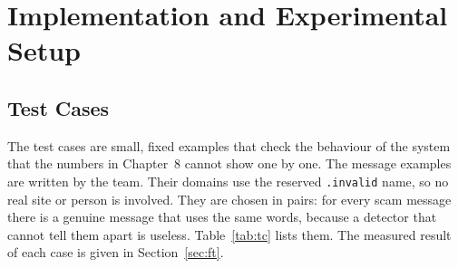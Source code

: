 \chapter{Implementation and Experimental Setup}\thispagestyle{thesisstyle} %
\graphicspath{{Chapter6/}}
{

\section{Test Cases}\label{sec:tc}
The test cases are small, fixed examples that check the behaviour of the system that the numbers in Chapter~8 cannot show one by one. The message examples are written by the team. Their domains use the reserved \texttt{.invalid} name, so no real site or person is involved. They are chosen in pairs: for every scam message there is a genuine message that uses the same words, because a detector that cannot tell them apart is useless. Table~\ref{tab:tc} lists them. The measured result of each case is given in Section~\ref{sec:ft}.

}
